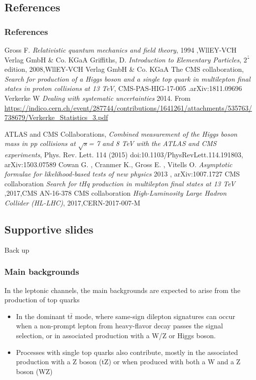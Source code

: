 \documentclass[11pt]{beamer}
\begin{document}
	\begin{thebibliography}{99}
	\begin{frame}
	\section{References}
	\frametitle{References}
	
	Gross F. \textit{Relativistic quantum mechanics and field theory}, 1994 ,WllEY-VCH Verlag GmbH \& Co. KGaA
	 Griffiths, D. \textit{Introduction to Elementary Particles}, $2^\frac{\circ}{}$ edition, 2008,WllEY-VCH Verlag GmbH \& Co. KGaA
		The CMS collaboration, \textit{Search for production of a Higgs boson and a single top
	quark in multilepton final states in proton collisions at 13 TeV}, CMS-PAS-HIG-17-005 .arXiv:1811.09696
	Verkerke W \textit{Dealing with systematic uncertainties} 2014. From
\url{https://indico.cern.ch/event/287744/contributions/1641261/attachments/535763/738679/Verkerke_Statistics_3.pdf}
\end{frame}

\begin{frame}
 ATLAS and CMS
Collaborations, \textit{Combined measurement of the Higgs boson mass in
	pp collisions at $\sqrt{s}$= 7 and 8 TeV with the ATLAS and CMS experiments}, Phys. Rev. Lett.
114 (2015) doi:10.1103/PhysRevLett.114.191803, arXiv:1503.07589
 Cowan G. , Cranmer K., Gross E. , Vitells O.\textit{ Asymptotic formulae for
	likelihood-based tests of new physics} 2013 , arXiv:1007.1727
CMS collaboration \textit{Search for tHq production in multilepton final states at 13 TeV} ,2017,CMS AN-16-378
CMS collaboration \textit{High-Luminosity Large Hadron Collider (HL-LHC)}, 2017,CERN-2017-007-M


\end{frame}
\end{thebibliography}

\begin{frame}
\section{Supportive slides}
\huge{Back up}
\end{frame}

\begin{frame}
\frametitle{Main backgrounds}
In the leptonic channels, the main backgrounds are expected to
arise from the production of top quarks
\begin{itemize}
	\item In the dominant t$\bar{t}$ mode, where 
	same-sign dilepton signatures can occur when a non-prompt lepton from heavy-flavor
	decay passes the signal selection, or in associated production with a W/Z or Higgs boson.
	\item Processes with single top quarks also contribute, mostly in the associated production with a Z
	boson (tZ) or when produced with both a W and a Z boson (WZ) 
	
\end{itemize}
\end{frame}
\end{document}
